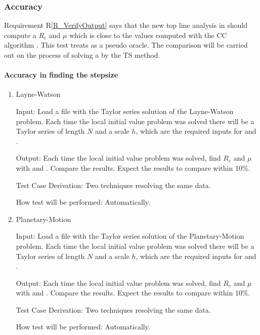 \documentclass[12pt, titlepage]{article}
\newcommand{\rref}[1]{R\ref{#1}}
\begin{document}
\subsubsection{Accuracy}

Requirement \rref{R_VerifyOutput} says that the new top line
analysis in  should compute a $R_c$ and $\mu$ which is
close to the values computed with the CC algorithm \rdcon.
This test treats \rdcon as a pseudo oracle.
The comparison will be carried out on the process of solving a \dae \ivp by the TS method.

\paragraph{Accuracy in finding the stepsize}

\begin{enumerate}

\item{Layne-Watson\\}

					
					
Input: Load a file with the Taylor series solution of the Layne-Watson problem. Each time the
    local initial value problem was solved there will be a Taylor series of length $N$ and a scale $h$,
    which are the required inputs for  and \rdcon.
					
Output: Each time the local initial value problem was solved, find $R_c$ and $\mu$ with
     and \rdcon. Compare the results. Expect the results to compare within 10\%.

Test Case Derivation: Two techniques resolving the same data.
					
How test will be performed: Automatically.
					
\item{Planetary-Motion\\}

					
					
Input: Load a file with the Taylor series solution of the Planetary-Motion problem. Each time the
    local initial value problem was solved there will be a Taylor series of length $N$ and a scale $h$,
    which are the required inputs for  and \rdcon.
					
Output: Each time the local initial value problem was solved, find $R_c$ and $\mu$ with
     and \rdcon. Compare the results. Expect the results to compare within 10\%.

Test Case Derivation: Two techniques resolving the same data.
					
How test will be performed: Automatically.

\end{enumerate}
\end{document}
